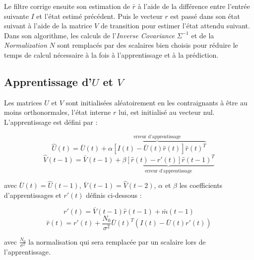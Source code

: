 Le filtre corrige ensuite son estimation de $\bar{r}$ à l'aide de la
différence entre l'entrée suivante $I$ et l'état estimé précédent. Puis le
vecteur $r$ est passé dans son état suivant à l'aide de la matrice $V$ de
transition pour estimer l'état attendu suivant.\\

Dans son algorithme, les calculs de l'\textit{Inverse Covariance} $\Sigma^{-1}$
et de la \textit{Normalization} $N$ sont remplacés par des scalaires bien
choisis %
pour réduire le temps de calcul nécessaire à la fois à
l'apprentissage et à la prédiction.


\subsection{Apprentissage d'$U$ et $V$} %
\label{sub:Apprentissage de U et V}

Les matrices $U$ et $V$ sont initialisées aléatoirement en les contraignants
à être au moins orthonormales, l'état interne $r$ lui, est initialisé au vecteur
nul. L'apprentissage est défini par :

\begin{equation}
   \label{eqn:learning_U}
   \hat{U}(t) = \bar{U}(t) + \overbrace{\alpha[I(t) - \bar{U}(t)\hat{r}(t)]\hat{r}(t)^T}^\text{erreur d'apprentissage}
\end{equation}
\begin{equation}
   \label{eqn:learning_V}
   \hat{V}(t-1) = \bar{V}(t-1) + \underbrace{\beta[\hat{r}(t) - r'(t)]\hat{r}(t-1)^T}_\text{erreur d'apprentissage}
\end{equation}

avec $\bar{U}(t) = \hat{U}(t-1)$, $\bar{V}(t-1) = \hat{V}(t-2)$, $\alpha$ et
$\beta$ les coefficients d'apprentissages et $r'(t)$ définis ci-dessous :

\begin{equation}
   \label{eqn:def_r_prime}
   r'(t) =  \bar{V}(t-1)\hat{r}(t-1) + \bar{m}(t-1)
\end{equation}
\begin{equation}
   \label{eqn:def_r_hat}
   \hat{r}(t) = r'(t) + \frac{N_0}{\sigma^2}\bar{U}(t)^T(I(t)-\bar{U}(t)r'(t))
\end{equation}

avec $\frac{N_0}{\sigma^2}$ la normalisation qui sera remplacée par un scalaire lors
de l'apprentissage.

